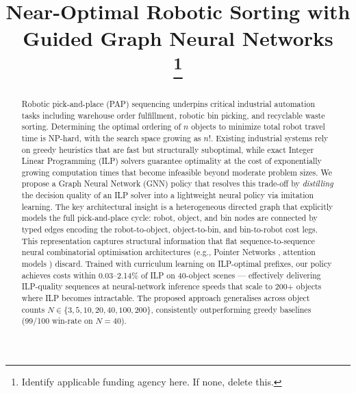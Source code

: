 \documentclass[conference]{IEEEtran}
\begin{document}
\title{\textbf{Near-Optimal Robotic Sorting with Guided Graph Neural Networks}\\
\thanks{Identify applicable funding agency here. If none, delete this.}
}

\author{
\and
{}
\and
{}
}

\maketitle

\begin{abstract}
Robotic pick-and-place (PAP) sequencing underpins critical industrial automation tasks including warehouse order fulfillment, robotic bin picking, and recyclable waste sorting. Determining the optimal ordering of $n$ objects to minimize total robot travel time is NP-hard, with the search space growing as $n!$. Existing industrial systems rely on greedy heuristics that are fast but structurally suboptimal, while exact Integer Linear Programming (ILP) solvers guarantee optimality at the cost of exponentially growing computation times that become infeasible beyond moderate problem sizes. We propose a Graph Neural Network (GNN) policy that resolves this trade-off by \emph{distilling} the decision quality of an ILP solver into a lightweight neural policy via imitation learning. The key architectural insight is a heterogeneous directed graph that explicitly models the full pick-and-place cycle: robot, object, and bin nodes are connected by typed edges encoding the robot-to-object, object-to-bin, and bin-to-robot cost legs. This representation captures structural information that flat sequence-to-sequence neural combinatorial optimisation architectures (e.g., Pointer Networks \cite{vinyals2015pointer}, attention models \cite{kool2019attention}) discard. Trained with curriculum learning on ILP-optimal prefixes, our policy achieves costs within 0.03--2.14\% of ILP on 40-object scenes --- effectively delivering ILP-quality sequences at neural-network inference speeds that scale to 200+ objects where ILP becomes intractable. The proposed approach generalises across object counts $N \in \{3, 5, 10, 20, 40, 100, 200\}$, consistently outperforming greedy baselines (99/100 win-rate on $N{=}40$).
\end{abstract}
\end{document}
